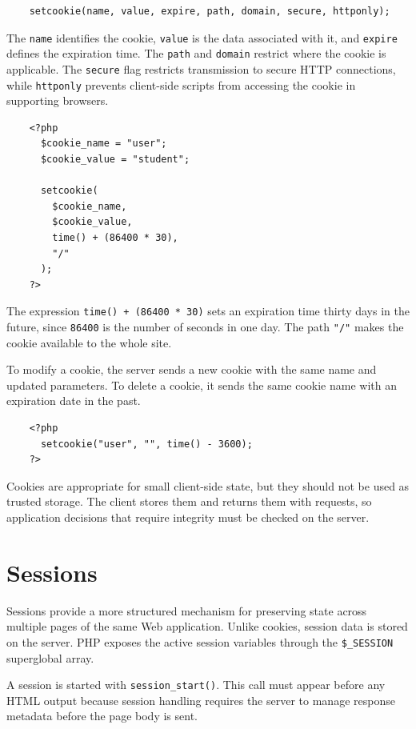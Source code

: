 \documentclass{scrbook}
\begin{document}
	\begin{lstlisting}
	setcookie(name, value, expire, path, domain, secure, httponly);
	\end{lstlisting}
	
	The \texttt{name} identifies the cookie, \texttt{value} is the data associated with it, and \texttt{expire} defines the expiration time. The \texttt{path} and \texttt{domain} restrict where the cookie is applicable. The \texttt{secure} flag restricts transmission to secure HTTP connections, while \texttt{httponly} prevents client-side scripts from accessing the cookie in supporting browsers.
	
	\begin{lstlisting}
	<?php
	  $cookie_name = "user";
	  $cookie_value = "student";
		
	  setcookie(
		$cookie_name,
		$cookie_value,
		time() + (86400 * 30),
		"/"
	  );
	?>
	\end{lstlisting}
	
	The expression \texttt{time() + (86400 * 30)} sets an expiration time thirty days in the future, since \texttt{86400} is the number of seconds in one day. The path \texttt{"/"} makes the cookie available to the whole site.
	
	To modify a cookie, the server sends a new cookie with the same name and updated parameters. To delete a cookie, it sends the same cookie name with an expiration date in the past.
	
	\begin{lstlisting}
	<?php
	  setcookie("user", "", time() - 3600);
	?>
	\end{lstlisting}
	
	Cookies are appropriate for small client-side state, but they should not be used as trusted storage. The client stores them and returns them with requests, so application decisions that require integrity must be checked on the server.
	
	\section{Sessions}
	
	Sessions provide a more structured mechanism for preserving state across multiple pages of the same Web application. Unlike cookies, session data is stored on the server. PHP exposes the active session variables through the \texttt{\$\_SESSION} superglobal array.
	
	A session is started with \texttt{session\_start()}. This call must appear before any HTML output because session handling requires the server to manage response metadata before the page body is sent.
	
\end{document}

